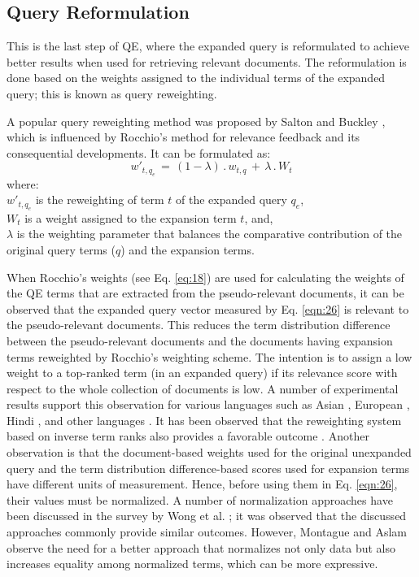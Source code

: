 \subsection{Query Reformulation}
This is the last step of QE, where the expanded query is reformulated to achieve better results when used for retrieving relevant documents. The reformulation is done based on the weights assigned to the individual terms of the expanded query; this is known as query reweighting.

A popular query reweighting method was proposed by Salton and Buckley \cite{Salton90improvingretrieval}, which is influenced by Rocchio's method \cite{rocchio1971relevance} for relevance feedback and  its consequential developments. It can be formulated as:
\begin{equation}\label{eqn:26}
w'_{t,q_e} \, = \, (1-\lambda)\,.\, w_{t,q}\, +\, \lambda \,.\, W_t
\end{equation}
where:\\
$w'_{t,q_e}$ is the reweighting of term $t$ of the expanded query $q_e$,\\ $ W_t$ is a weight assigned to the expansion term $t$, and,\\ $\lambda$ is the weighting parameter that balances the comparative contribution of the original query  terms ($q$) and the expansion terms.  

When Rocchio's weights (see Eq. \ref{eq:18}) are used for calculating the weights of the QE terms that are extracted from the pseudo-relevant documents, it can be observed that the expanded query vector measured by Eq. \ref{eqn:26} is relevant to the pseudo-relevant documents. This reduces the term distribution difference between the pseudo-relevant documents and the documents having expansion terms reweighted by Rocchio's weighting scheme. The intention is to assign a low weight to a top-ranked term (in an expanded query) if its relevance score with respect to the whole collection of documents is low. A number of experimental results support this observation for various languages such as Asian \cite{savoy2005comparative}, European  \cite{darwish2014arabic,larkey2007light,amati2003probabilistic}, Hindi \cite{bhattacharya2016usingword,paik2014incremental}, and other languages \cite{zhang2016learning,paik2014incremental,wong2008re,carpineto2001information}. It has been observed that the reweighting system based on inverse term ranks also provides a favorable outcome \cite{hu2006improving,carpineto2002improving}. Another observation is that the document-based weights used for the original unexpanded query and the term distribution difference-based scores used for expansion terms have different units of measurement. Hence, before using them in Eq. \ref{eqn:26}, their values must be normalized. A number of normalization approaches have been discussed in the survey by Wong et al. \cite{wong2008re}; it was observed that the discussed approaches commonly provide similar outcomes. However, Montague and Aslam \cite{montague2001relevance} observe the need for  a better approach that normalizes not only data but also increases equality among normalized terms, which can be more expressive.

